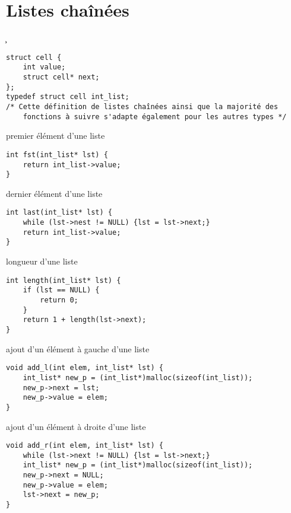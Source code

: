 \section{Listes chaînées}
\c
\begin{tp*}{}
\begin{verbatim}
struct cell {
    int value;
    struct cell* next;
};
typedef struct cell int_list;
/* Cette définition de listes chaînées ainsi que la majorité des
    fonctions à suivre s'adapte également pour les autres types */
\end{verbatim}
\end{tp*}
\begin{fnc*}{premier élément d'une liste}
\begin{verbatim}
int fst(int_list* lst) {
    return int_list->value;
}
\end{verbatim}
\end{fnc*}
\begin{fnc*}{dernier élément d'une liste}
\begin{verbatim}
int last(int_list* lst) {
    while (lst->nest != NULL) {lst = lst->next;}
    return int_list->value;
}
\end{verbatim}
\end{fnc*}
\begin{fnc*}{longueur d'une liste}
\begin{verbatim}
int length(int_list* lst) {
    if (lst == NULL) {
        return 0;
    }
    return 1 + length(lst->next);
}
\end{verbatim}
\end{fnc*}
\begin{fnc*}{ajout d'un élément à gauche d'une liste}
\begin{verbatim}
void add_l(int elem, int_list* lst) {
    int_list* new_p = (int_list*)malloc(sizeof(int_list));
    new_p->next = lst;
    new_p->value = elem;
}
\end{verbatim}
\end{fnc*}
\begin{fnc*}{ajout d'un élément à droite d'une liste}
\begin{verbatim}
void add_r(int elem, int_list* lst) {
    while (lst->next != NULL) {lst = lst->next;}
    int_list* new_p = (int_list*)malloc(sizeof(int_list));
    new_p->next = NULL;
    new_p->value = elem;
    lst->next = new_p;
}
\end{verbatim}
\end{fnc*}
